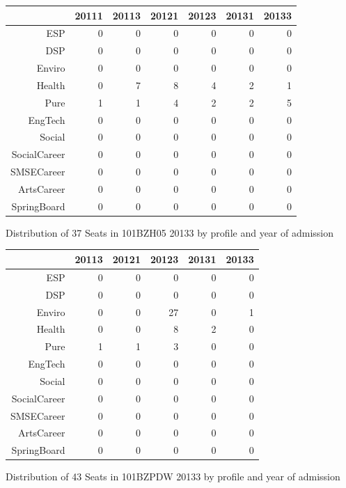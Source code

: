 \documentclass{article}\usepackage[]{graphicx}\usepackage[]{color}
\begin{document}
\begin{figure}[H]
\centering
\begin{tabular}{rrrrrrr}
  \hline
 & 20111 & 20113 & 20121 & 20123 & 20131 & 20133 \\ 
  \hline
ESP &   0 &   0 &   0 &   0 &   0 &   0 \\ 
  DSP &   0 &   0 &   0 &   0 &   0 &   0 \\ 
  Enviro &   0 &   0 &   0 &   0 &   0 &   0 \\ 
  Health &   0 &   7 &   8 &   4 &   2 &   1 \\ 
  Pure &   1 &   1 &   4 &   2 &   2 &   5 \\ 
  EngTech &   0 &   0 &   0 &   0 &   0 &   0 \\ 
  Social &   0 &   0 &   0 &   0 &   0 &   0 \\ 
  SocialCareer &   0 &   0 &   0 &   0 &   0 &   0 \\ 
  SMSECareer &   0 &   0 &   0 &   0 &   0 &   0 \\ 
  ArtsCareer &   0 &   0 &   0 &   0 &   0 &   0 \\ 
  SpringBoard &   0 &   0 &   0 &   0 &   0 &   0 \\ 
   \hline
\end{tabular}
\caption{Distribution of 37 Seats in 101BZH05 20133 by profile and year of admission} 
\end{figure}
\begin{figure}[H]
\centering
\begin{tabular}{rrrrrr}
  \hline
 & 20113 & 20121 & 20123 & 20131 & 20133 \\ 
  \hline
ESP &   0 &   0 &   0 &   0 &   0 \\ 
  DSP &   0 &   0 &   0 &   0 &   0 \\ 
  Enviro &   0 &   0 &  27 &   0 &   1 \\ 
  Health &   0 &   0 &   8 &   2 &   0 \\ 
  Pure &   1 &   1 &   3 &   0 &   0 \\ 
  EngTech &   0 &   0 &   0 &   0 &   0 \\ 
  Social &   0 &   0 &   0 &   0 &   0 \\ 
  SocialCareer &   0 &   0 &   0 &   0 &   0 \\ 
  SMSECareer &   0 &   0 &   0 &   0 &   0 \\ 
  ArtsCareer &   0 &   0 &   0 &   0 &   0 \\ 
  SpringBoard &   0 &   0 &   0 &   0 &   0 \\ 
   \hline
\end{tabular}
\caption{Distribution of 43 Seats in 101BZPDW 20133 by profile and year of admission} 
\end{figure}
\end{document}
